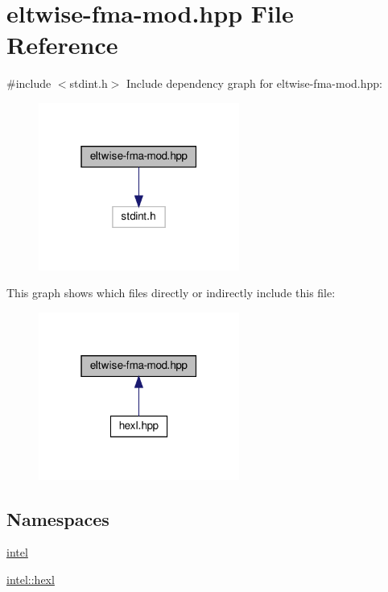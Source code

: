 \hypertarget{eltwise-fma-mod_8hpp}{}\section{eltwise-\/fma-\/mod.hpp File Reference}
\label{eltwise-fma-mod_8hpp}
{\ttfamily \#include $<$stdint.\+h$>$}\newline
Include dependency graph for eltwise-\/fma-\/mod.hpp\+:
\nopagebreak
\begin{figure}[H]
\begin{center}
\leavevmode
\includegraphics[width=187pt]{eltwise-fma-mod_8hpp__incl}
\end{center}
\end{figure}
This graph shows which files directly or indirectly include this file\+:
\nopagebreak
\begin{figure}[H]
\begin{center}
\leavevmode
\includegraphics[width=187pt]{eltwise-fma-mod_8hpp__dep__incl}
\end{center}
\end{figure}
\subsection*{Namespaces}
\begin{DoxyCompactItemize}
\item 
 \hyperlink{namespaceintel}{intel}
\item 
 \hyperlink{namespaceintel_1_1hexl}{intel\+::hexl}
\end{DoxyCompactItemize}
